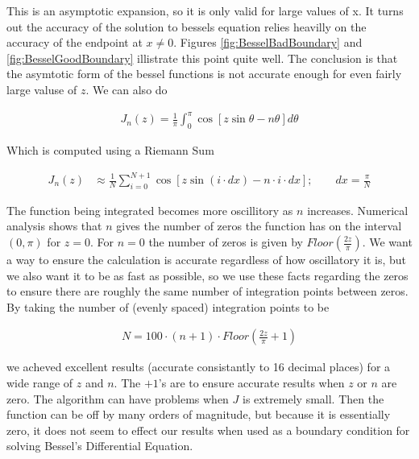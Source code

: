 \documentclass[onecolumn, groupedaddress, 10pt]{revtex4-1}
\begin{document}
This is an asymptotic expansion, so it is only valid for large values of x.  It turns out the accuracy of the solution to bessels equation relies heavilly on the accuracy of the endpoint at $x \neq 0$.  Figures \ref{fig:BesselBadBoundary} and \ref{fig:BesselGoodBoundary} illistrate this point quite well.  The conclusion is that the asymtotic form of the bessel functions is not accurate enough for even fairly large valuse of $z$.  We can also do

\begin{align}
J_n (z) = \frac{1}{\pi} \int_{0}^{\pi} \cos \left[ z \sin \theta - n \theta \right] d \theta
\end{align}

Which is computed using a Riemann Sum

\begin{align}
\label{eqn:numericalIntegralBessel}
J_n (z) &\approx \frac{1}{N} \sum_{i=0}^{N+1} \cos \left[ z \sin(i \cdot dx) - n \cdot i \cdot dx \right];
\qquad dx = \frac{\pi}{N}
\end{align}

The function being integrated becomes more oscillitory as $n$ increases.  Numerical analysis shows that $n$ gives the number of zeros the function has  on the interval $(0,\pi)$ for $z=0$.  For $n=0$ the number of zeros is given by $Floor (\frac{2z}{\pi})$.  We want a way to ensure the calculation is accurate regardless of how oscillatory it is, but we also want it to be as fast as possible, so we use these facts regarding the zeros to ensure there are roughly the same number of integration points between zeros.  By taking the number of (evenly spaced) integration points to be

\begin{align}
\label{eqn:dynamicIntegrationPoints}
N = 100 \cdot (n + 1) \cdot Floor \left( \frac{2z}{\pi} + 1 \right)
\end{align}

we acheved excellent results (accurate consistantly to 16 decimal places) for a wide range of $z$ and $n$.  The $+1$'s are to ensure accurate results when $z$ or $n$ are zero.  The algorithm can have problems when $J$ is extremely small.  Then the function can be off by many orders of magnitude, but because it is essentially zero, it does not seem to effect our results when used as a boundary condition for solving Bessel's Differential Equation.
\end{document}

